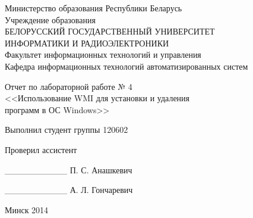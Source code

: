 \thispagestyle{empty}
\setlength{\parindent}{0ex} %

\begin{center}
  Министерство образования Республики Беларусь \\
  \smallskip
  Учреждение образования \\
  БЕЛОРУССКИЙ ГОСУДАРСТВЕННЫЙ УНИВЕРСИТЕТ \\
  ИНФОРМАТИКИ И РАДИОЭЛЕКТРОНИКИ \\
  \smallskip
  Факультет информационных технологий и управления \\
  \smallskip
  Кафедра информационных технологий автоматизированных систем
\end{center}

\vspace{50mm}

\begin{center}
  Отчет по лабораторной работе № 4 \\
  <<Использование WMI для установки и удаления \\
  программ в ОС Windows>> \\
\end{center}

\vspace{50mm}

\begin{minipage}{.55\linewidth}
  Выполнил студент группы 120602

  \smallskip

  Проверил ассистент
\end{minipage}
\hfill
\begin{minipage}{.4\linewidth}
  \begin{flushright}
    \_\_\_\_\_\_\_\_\_\_ П. С. Анашкевич

    \smallskip

    \_\_\_\_\_\_\_\_\_\_ А. Л. Гончаревич
  \end{flushright}
\end{minipage}

\vspace{50mm}
\begin{center}
  Минск 2014
\end{center}

\setlength{\parindent}{5ex} %
